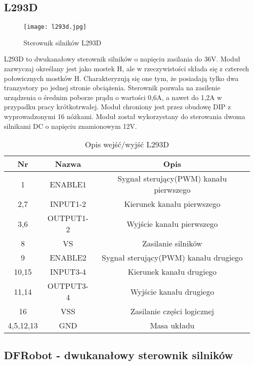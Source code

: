 \subsection{L293D}%
\begin{figure}[H]
	\centering
	\texttt{[image: l293d.jpg]}
	\caption{Sterownik silników L293D}
\end{figure}
L293D to dwukanałowy sterownik silników o napięciu zasilania do 36V. Moduł zazwyczaj określany jest jako mostek H, ale w rzeczywistości składa się z czterech połowicznych mostków H. Charakteryzują się one tym, że posiadają tylko dwa tranzystory po jednej stronie obciążenia. Sterownik pozwala na zasilenie urządzenia o średnim poborze prądu o wartości 0,6A, a nawet do 1,2A w przypadku pracy krótkotrwałej. Moduł chroniony jest przez obudowę DIP z wyprowadzonymi 16 nóżkami. Moduł został wykorzystany do sterowania dwoma silnikami DC o napięciu znamionowym 12V.
\begin{table}[H]
	\centering
	\caption{Opis wejść/wyjść L293D}
	\begin{tabular}{|c|c|c|}
		
  \hline 
 \bfseries Nr & \bfseries Nazwa & \bfseries Opis \\
  \hline
    1&ENABLE1&Sygnał sterujący(PWM) kanału pierwszego \\
  \hline
      2,7&INPUT1-2&Kierunek kanału pierwszego  \\
  \hline
  3,6&OUTPUT1-2&Wyjście kanału pierwszego  \\
  \hline
           8&VS&Zasilanie silników  \\
  \hline
    9&ENABLE2&Sygnał sterujący(PWM) kanału drugiego \\
  \hline
       10,15&INPUT3-4&Kierunek kanału drugiego  \\
  \hline
  11,14&OUTPUT3-4&Wyjście kanału drugiego  \\
  \hline
       16&VSS&Zasilanie części logicznej  \\
  \hline
           4,5,12,13&GND&Masa układu  \\
  \hline
\end{tabular}
\end{table}
\newpage
\subsection{DFRobot - dwukanałowy sterownik silników }%

